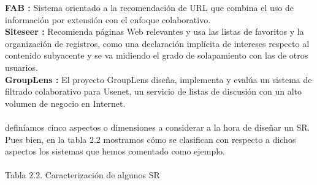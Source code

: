 \begin{enumerate}
    \textbf{FAB :} Sistema orientado a la recomendación de URL que combina el uso de información por extensión con el enfoque colaborativo.\\
    
    \textbf{Siteseer :} Recomienda páginas Web relevantes y usa las listas de favoritos y la organización de registros, como una declaración implícita de intereses respecto al contenido subyacente y se va midiendo el grado de solapamiento con las de otros usuarios.\\
    
    \textbf{GroupLens :} El proyecto GroupLens diseña, implementa y evalúa un sistema de filtrado colaborativo para Usenet, un servicio de listas de discusión con un alto volumen de negocio en Internet.\\\\
    definíamos cinco aspectos o dimensiones a considerar a la hora de diseñar un SR. Pues bien, en la tabla 2.2 mostramos cómo se clasifican con respecto a dichos aspectos los sistemas que hemos comentado como ejemplo.\\\\
    Tabla 2.2. Caracterización de algunos SR
    

\end{enumerate}
